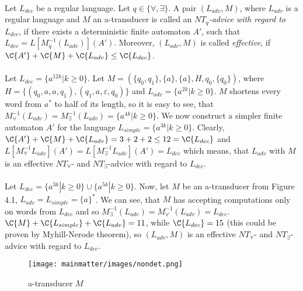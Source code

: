 \paragraph{}
\cdefinicia Let $L_{dec}$ be a regular language. Let $q \in \{\forall,\exists\}$. A pair $(L_{adv}, M)$, where $L_{adv}$ is a regular language and $M$ an a-transducer is called an \emph{$NT_{q}$-advice with regard to $L_{dec}$}, if there exists a deterministic finite automaton $A'$, such that $L_{dec} = L[M_{q}^{-1}(L_{adv})](A')$. Moreover, $(L_{adv}, M)$ is called \emph{effective}, if $\C{A'} + \C{M} + \C{L_{adv}} \leq	 \C{L_{dec}}$.

\paragraph{}
\cpriklad Let $L_{dec} = \{ a^{12k}| k \geq 0 \} $. Let $M= (\{q_0, q_1\}, \{a\}, \{a\}, H, q_0, \{q_0\})$, where $H = \{(q_0, a, a, q_1), (q_1, a, \varepsilon, q_0)\}$ and $L_{adv} = \{ a^{2k}| k \geq 0 \}$. $M$ shortens every word from $a^*$ to half of its length, so it is easy to see, that $M_{\forall}^{-1}(L_{adv}) = M_{\exists}^{-1}(L_{adv}) = \{ a^{4k}| k \geq 0 \}$. We now construct a simpler finite automaton $A'$ for the language $L_{simple} = \{ a^{3k}| k \geq 0 \}$. Clearly, $\C{A'} + \C{M} + \C{L_{adv}} = 3 + 2 + 2 \leq 12 = \C{L_{dec}}$ and $L[M^{-1}_{\forall}L_{adv}](A') = L[M^{-1}_{\exists}L_{adv}](A') = L_{dec}$ which means, that $L_{adv}$ with $M$ is an effective $NT_{\forall}$- and $NT_{\exists}$-advice with regard  to $L_{dec}$.

\paragraph{}
\cpriklad Let $L_{dec} = \{ a^{3k}|k \geq 0 \} \cup \{ a^{5k}|k \geq 0\}$. Now, let $M$ be an a-transducer from Figure 4.1, $L_{adv} = L_{simple} = \{a\}^*$. We can see, that $M$ has accepting computations only on words from $L_{dec}$ and so $M^{-1}_{\exists}(L_{adv}) = M^{-1}_{\forall}(L_{adv}) = L_{dec}$. $\C{M} + \C{L_{simple}} + \C{L_{adv}} = 11$, while $\C{L_{dec}} = 15$ (this could be proven by Myhill-Nerode theorem), so $(L_{adv},M)$ is an effective $NT_{\forall}$- and $NT_{\exists}$-advice with regard  to $L_{dec}$.

\begin{figure}[h!]
\centering
\texttt{[image: mainmatter/images/nondet.png]}
\caption{a-transducer $M$}
\end{figure}

